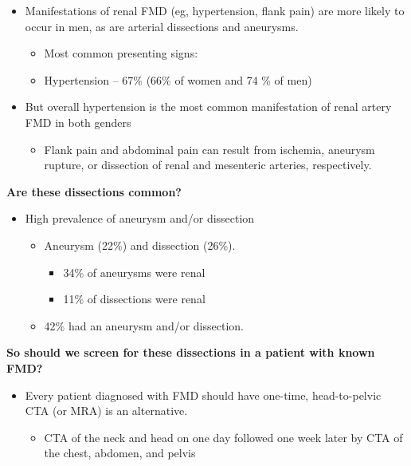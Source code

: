 \documentclass[
]{book}
\providecommand{\tightlist}{%
  \setlength{\itemsep}{0pt}\setlength{\parskip}{0pt}}
\begin{document}
\begin{itemize}
\item
  Manifestations of renal FMD (eg, hypertension, flank pain) are more
  likely to occur in men, as are arterial dissections and aneurysms.

  \begin{itemize}
  \item
    Most common presenting signs:
  \item
    Hypertension -- 67\% (66\% of women and 74 \% of men)
  \end{itemize}
\item
  But overall hypertension is the most common manifestation of renal
  artery FMD in both genders

  \begin{itemize}
  \tightlist
  \item
    Flank pain and abdominal pain can result from ischemia, aneurysm
    rupture, or dissection of renal and mesenteric arteries,
    respectively.
  \end{itemize}
\end{itemize}

\textbf{Are these dissections common?}

\begin{itemize}
\item
  High prevalence of aneurysm and/or dissection

  \begin{itemize}
  \item
    Aneurysm (22\%) and dissection (26\%).

    \begin{itemize}
    \item
      34\% of aneurysms were renal
    \item
      11\% of dissections were renal
    \end{itemize}
  \item
    42\% had an aneurysm and/or dissection.
  \end{itemize}
\end{itemize}

\textbf{So should we screen for these dissections in a patient with known
FMD?}

\begin{itemize}
\item
  Every patient diagnosed with FMD should have one-time,
  head-to-pelvic CTA (or MRA) is an alternative.

  \begin{itemize}
  \tightlist
  \item
    CTA of the neck and head on one day followed one week later by
    CTA of the chest, abdomen, and pelvis
  \end{itemize}
\end{itemize}
\end{document}

